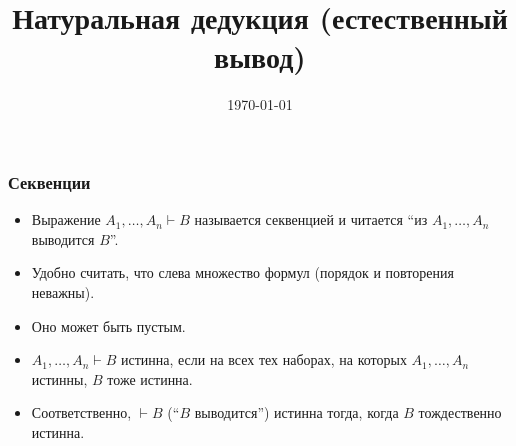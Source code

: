 \documentclass[10pt]{beamer}
\title{Натуральная дедукция (естественный вывод)}
\date{\today}
\begin{document}
\begin{frame}[plain]
    \maketitle
\end{frame}

\begin{frame}
    \frametitle{Секвенции}
    \begin{itemize}
        \item Выражение $A_1,\ldots,A_n \vdash B$ называется секвенцией и читается \enquote{из $A_1,\ldots,A_n$ выводится $B$}.
        \item Удобно считать, что слева множество формул (порядок и повторения неважны).
        \item Оно может быть пустым. \pause
        \item $A_1,\ldots,A_n \vdash B$ истинна, если \pause на всех тех наборах, на которых $A_1,\ldots,A_n$ истинны, \pause $B$ тоже истинна.
        \item Соответственно, $\vdash B$ (\enquote{$B$ выводится}) истинна тогда, когда $B$ \pause тождественно истинна.
    \end{itemize}
\end{frame}
\end{document}
